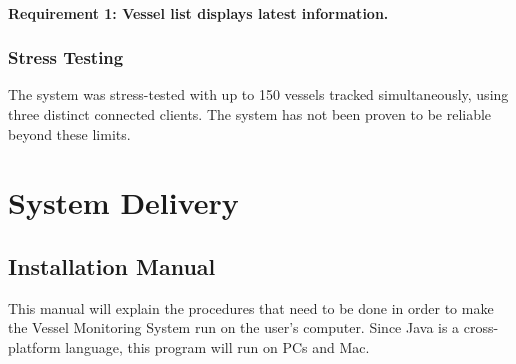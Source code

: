 \documentclass{article}
\begin{document}
\paragraph{Requirement 1: Vessel list displays latest information.}


\subsubsection{Stress Testing} %


The system was stress-tested with up to 150 vessels tracked simultaneously, using three distinct connected clients. The system has not been proven to be reliable beyond these limits.

\section{System Delivery}


\subsection{Installation Manual}

This manual will explain the procedures that need to be done in order to make the Vessel Monitoring System run on the user's computer. Since Java is a cross-platform language, this program will run on PCs and Mac.
\end{document}
